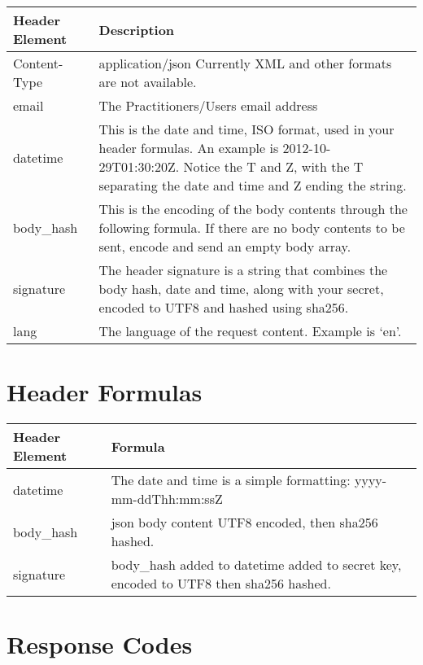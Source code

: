 \documentclass[letterpaper,10pt,english]{sphinxmanual}
\begin{document}
\begin{tabulary}{\linewidth}{|L|L|}
\hline
\textsf{\relax 
Header Element
} & \textsf{\relax 
Description
}\\
\hline
Content-Type
 & 
application/json
Currently XML and other formats are not available.
\\

email
 & 
The Practitioners/Users email address
\\

datetime
 & 
This is the date and time, ISO format, used in your
header formulas. An example is 2012-10-29T01:30:20Z.
Notice the T and Z, with the T separating the date and
time and Z ending the string.
\\

body\_hash
 & 
This is the encoding of the body contents through the
following formula. If there are no body contents to be
sent, encode and send an empty body array.
\\

signature
 & 
The header signature is a string that combines the body
hash, date and time, along with your secret, encoded to
UTF8 and hashed using sha256.
\\

lang
 & 
The language of the request content. Example is `en'.
\\
\hline\end{tabulary}



\section{Header Formulas}
\label{dev-api-overview:header-formulas}
\begin{tabulary}{\linewidth}{|L|L|}
\hline
\textsf{\relax 
Header Element
} & \textsf{\relax 
Formula
}\\
\hline
datetime
 & 
The date and time is a simple formatting:
yyyy-mm-ddThh:mm:ssZ
\\

body\_hash
 & 
json body content UTF8 encoded, then sha256 hashed.
\\

signature
 & 
body\_hash added to datetime added to secret key, encoded
to UTF8 then sha256 hashed.
\\
\hline\end{tabulary}



\section{Response Codes}
\label{dev-api-overview:response-codes}
\end{document}
